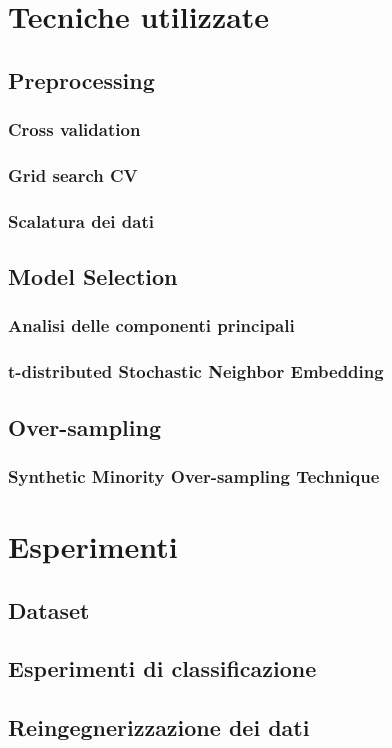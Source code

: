 \documentclass[12pt, twoside, letterpaper]{report}
\begin{document}
	\chapter{Tecniche utilizzate}
		\section{Preprocessing}
			\subsection{Cross validation}
			\subsection{Grid search CV}
			\subsection{Scalatura dei dati}
		\section{Model Selection}			
			\subsection{Analisi delle componenti principali}
			\subsection{t-distributed Stochastic Neighbor Embedding}
		\section{Over-sampling}
			\subsection{Synthetic Minority Over-sampling Technique}
		
	\chapter{Esperimenti}
		\section{Dataset}
		\section{Esperimenti di classificazione}
		\section{Reingegnerizzazione dei dati}
\end{document}
